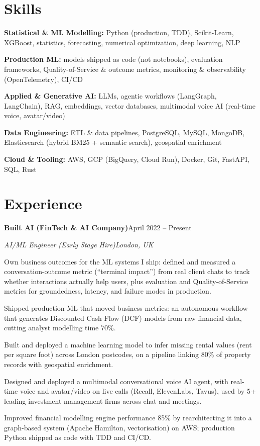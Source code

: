 \documentclass[10pt,a4paper]{article}
\newcommand{\entry}[4]{%
  {\color{company}\bfseries #1}\hfill {\color{muted}#2}\par
  \vspace{1pt}
  {\itshape #3}\hfill {\color{muted}\itshape #4}\par
  \vspace{3pt}%
}
\begin{document}
\section{Skills}
\begin{tight}
  \item[\textcolor{accent}{\small$\bullet$}] \textbf{Statistical \& ML Modelling:} Python (production, TDD), Scikit-Learn, XGBoost, statistics, forecasting, numerical optimization, deep learning, NLP
  \item[\textcolor{accent}{\small$\bullet$}] \textbf{Production ML:} models shipped as code (not notebooks), evaluation frameworks, Quality-of-Service \& outcome metrics, monitoring \& observability (OpenTelemetry), CI/CD
  \item[\textcolor{accent}{\small$\bullet$}] \textbf{Applied \& Generative AI:} LLMs, agentic workflows (LangGraph, LangChain), RAG, embeddings, vector databases, multimodal voice AI (real-time voice, avatar/video)
  \item[\textcolor{accent}{\small$\bullet$}] \textbf{Data Engineering:} ETL \& data pipelines, PostgreSQL, MySQL, MongoDB, Elasticsearch (hybrid BM25 + semantic search), geospatial enrichment
  \item[\textcolor{accent}{\small$\bullet$}] \textbf{Cloud \& Tooling:} AWS, GCP (BigQuery, Cloud Run), Docker, Git, FastAPI, SQL, Rust
\end{tight}

\section{Experience}
\entry{Built AI (FinTech \& AI Company)}{April 2022 -- Present}{AI/ML Engineer (Early Stage Hire)}{London, UK}
\begin{tight}
  \item Own business outcomes for the ML systems I ship: defined and measured a conversation-outcome metric (``terminal impact'') from real client chats to track whether interactions actually help users, plus evaluation and Quality-of-Service metrics for groundedness, latency, and failure modes in production.
  \item Shipped production ML that moved business metrics: an autonomous workflow that generates Discounted Cash Flow (DCF) models from raw financial data, cutting analyst modelling time 70\%.
  \item Built and deployed a machine learning model to infer missing rental values (rent per square foot) across London postcodes, on a pipeline linking 80\% of property records with geospatial enrichment.
  \item Designed and deployed a multimodal conversational voice AI agent, with real-time voice and avatar/video on live calls (Recall, ElevenLabs, Tavus), used by 5+ leading investment management firms across chat and meetings.
  \item Improved financial modelling engine performance 85\% by rearchitecting it into a graph-based system (Apache Hamilton, vectorisation) on AWS; production Python shipped as code with TDD and CI/CD.
\end{tight}
\end{document}

